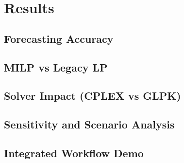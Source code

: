 \newpage
\section{Results}

\subsection{Forecasting Accuracy}

\subsection{MILP vs Legacy LP}

\subsection{Solver Impact (CPLEX vs GLPK)}

\subsection{Sensitivity and Scenario Analysis}

\subsection{Integrated Workflow Demo}

\newpage 